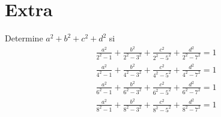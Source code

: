 \section{Extra}

\begin{section-problem}
    Determine $a^2 + b^2 + c^2 + d^2$ si
    \begin{gather*}
        \frac{a^2}{2^2 - 1} + \frac{b^2}{2^2 - 3^2} + \frac{c^2}{2^2 - 5^2} + \frac{d^2}{2^2 - 7^2} = 1\\
        \frac{a^2}{4^2 - 1} + \frac{b^2}{4^2 - 3^2} + \frac{c^2}{4^2 - 5^2} + \frac{d^2}{4^2 - 7^2} = 1\\
        \frac{a^2}{6^2 - 1} + \frac{b^2}{6^2 - 3^2} + \frac{c^2}{6^2 - 5^2} + \frac{d^2}{6^2 - 7^2} = 1\\
        \frac{a^2}{8^2 - 1} + \frac{b^2}{8^2 - 3^2} + \frac{c^2}{8^2 - 5^2} + \frac{d^2}{8^2 - 7^2} = 1
    \end{gather*}
\end{section-problem}